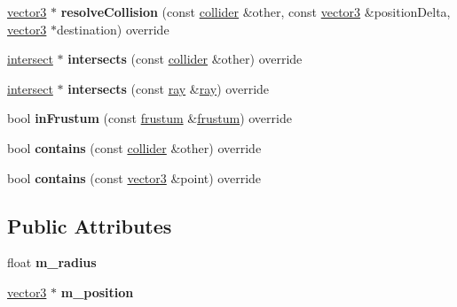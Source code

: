 \begin{DoxyCompactItemize}
\mbox{\label{classflounder_1_1sphere_aa15e90e33b6b6f91a9c3fa55a4e4115e}} 
\hyperlink{classflounder_1_1vector3}{vector3} $\ast$ {\bfseries resolve\+Collision} (const \hyperlink{classflounder_1_1collider}{collider} \&other, const \hyperlink{classflounder_1_1vector3}{vector3} \&position\+Delta, \hyperlink{classflounder_1_1vector3}{vector3} $\ast$destination) override
\item 
\mbox{\label{classflounder_1_1sphere_a3749a13b6c4cdd93469e50f022d7a097}} 
\hyperlink{classflounder_1_1intersect}{intersect} $\ast$ {\bfseries intersects} (const \hyperlink{classflounder_1_1collider}{collider} \&other) override
\item 
\mbox{\label{classflounder_1_1sphere_a2622ae996a73b39d9836bba2e0d43916}} 
\hyperlink{classflounder_1_1intersect}{intersect} $\ast$ {\bfseries intersects} (const \hyperlink{classflounder_1_1ray}{ray} \&\hyperlink{classflounder_1_1ray}{ray}) override
\item 
\mbox{\label{classflounder_1_1sphere_a9f926b8c9952282c9f6d251e163e7cbd}} 
bool {\bfseries in\+Frustum} (const \hyperlink{classflounder_1_1frustum}{frustum} \&\hyperlink{classflounder_1_1frustum}{frustum}) override
\item 
\mbox{\label{classflounder_1_1sphere_a11527d5a431e137decc2bd84c61662ad}} 
bool {\bfseries contains} (const \hyperlink{classflounder_1_1collider}{collider} \&other) override
\item 
\mbox{\label{classflounder_1_1sphere_a357fe4e2124576134bba850bd308b2d5}} 
bool {\bfseries contains} (const \hyperlink{classflounder_1_1vector3}{vector3} \&point) override
\end{DoxyCompactItemize}
\subsection*{Public Attributes}
\begin{DoxyCompactItemize}
\item 
\mbox{\label{classflounder_1_1sphere_aac64797b8fe65b438f51d9eedce60df7}} 
float {\bfseries m\+\_\+radius}
\item 
\mbox{\label{classflounder_1_1sphere_ab1f889c31c7f5eb9265fa91feae23a84}} 
\hyperlink{classflounder_1_1vector3}{vector3} $\ast$ {\bfseries m\+\_\+position}
\end{DoxyCompactItemize}


